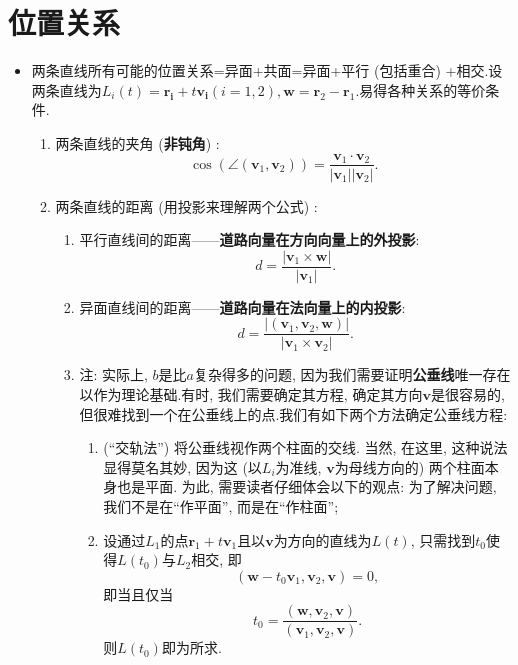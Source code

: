 \documentclass[./main.tex]{subfiles}
\begin{document}
\section{位置关系}
\begin{itemize}
    \item 两条直线所有可能的位置关系=异面+共面=异面+平行 (包括重合) +相交.设两条直线为$L_i(t)=\mathbf{r_i}+t\mathbf{v_i}(i=1,2),\mathbf{w}$$=\mathbf{r}_2-\mathbf{r}_1.$易得各种关系的等价条件.
    \begin{enumerate}
        \item 两条直线的夹角 (\textbf{非钝角}) : $$\cos(\angle (\mathbf{v}_1,\mathbf{v}_2))=\frac{\mathbf{v}_1\cdot \mathbf{v}_2}{|\mathbf{v}_1||\mathbf{v}_2|}.$$
        \item 两条直线的距离 (用投影来理解两个公式) : 
        \begin{enumerate}
            \item 平行直线间的距离——\textbf{道路向量在方向向量上的外投影}: $$d=\frac{|\mathbf{v}_1\times \mathbf{w}|}{|\mathbf{v}_1|}.$$
            \item 异面直线间的距离——\textbf{道路向量在法向量上的内投影}: $$d=\frac{|(\mathbf{v}_1,\mathbf{v}_2,\mathbf{w})|}{|\mathbf{v}_1\times \mathbf{v}_2|}.$$
            \item 注: 实际上, $b$是比$a$复杂得多的问题, 因为我们需要证明\textbf{公垂线}唯一存在以作为理论基础.有时, 我们需要确定其方程, 确定其方向$\mathbf{v}$是很容易的, 但很难找到一个在公垂线上的点.我们有如下两个方法确定公垂线方程: 
            \begin{enumerate}
                \item  (``交轨法'') 将公垂线视作两个柱面的交线. 当然, 在这里, 这种说法显得莫名其妙, 因为这 (以$L_i$为准线, $\mathbf{v}$为母线方向的) 两个柱面本身也是平面. 为此, 需要读者仔细体会以下的观点: 为了解决问题, 我们不是在``作平面'', 而是在``作柱面''; 
                \item 设通过$L_1$的点$\mathbf{r}_1+t\mathbf{v}_1$且以$\mathbf{v}$为方向的直线为$L(t)$, 只需找到$t_0$使得$L(t_0)$与$L_2$相交, 即$$(\mathbf{w}-t_0\mathbf{v}_1,\mathbf{v}_2,\mathbf{v})=0,$$即当且仅当$$t_0=\frac{(\mathbf{w},\mathbf{v}_2,\mathbf{v})}{(\mathbf{v}_1,\mathbf{v}_2,\mathbf{v})}.$$则$L(t_0)$即为所求.
            \end{enumerate}

\end{enumerate}
\end{enumerate}
\end{itemize}
\end{document}
